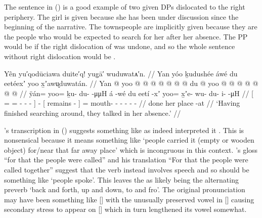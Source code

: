 The sentence in (\lastx) is a good example of two given DPs dislocated to the right periphery.
The girl  is given because she has been under discussion since the beginning of the narrative.
The townspeople  are implicitly given because they are the people who would be expected to search for her after her absence.
The PP  would be  if the right dislocation of  was undone, and so the whole sentence without right dislocation would be .

\ex\label{ex:89-20-done-searching-talked}%
%
\begingl
	\glpreamble	Yên yu′qodūciawa duite′q! yug̣ā′ wuduwatᴀ′n. //
	\glpreamble	Yan yóo ḵudushée áwé du eetéexʼ yoo x̱ʼawu̬duwatán. //
	\gla	{} Yan @ yoo @  @ {} @ {} @ {} @ {} @ {} {}
		 @ {}
		{} du  @ {} {}
		yoo @  @ {} @ {} @ {} @ {} @ {} @ {} //
	\glb	{} ÿán= yoo= ḵu- {} du-  -μμH {} {}
		á -wé
		{} du eetí -xʼ {}
		yoo= x̱ʼe- wu- du- {} i-  -μH //
	\glc	{}[ = = - \· -  - \· {}]
		 -
		{}[  remains - {}]
		= mouth- - - - -  - //
	\gld	{} done   {} {} {} {} {} {}
		 {}
		{} her place -at {}
		  {} {} {} {} {} {} //
	\glft	‘Having finished searching around, they talked in her absence.’
		//
\endgl
\xe

\citeauthor{swanton:1909}’s transcription  in (\lastx) suggests something like  as indeed \citeauthor{leer:1977} interpreted it \parencite[2]{leer:1977}.
This is nonsensical because it means something like ‘people carried it (empty or wooden object) for/near that far away place’ which is incongruous in this context.
\citeauthor{swanton:1909}’s gloss “for that the people were called” and his translation “For that the people were called together” suggest that the verb instead involves speech and so should be something like  ‘people spoke’.
This leaves the  as likely being the alternating preverb  ‘back and forth, up and down, to and fro’.
The original pronunciation may have been something like [] with the unusually preserved vowel in [] causing secondary stress to appear on [] which in turn lengthened its vowel somewhat. 

